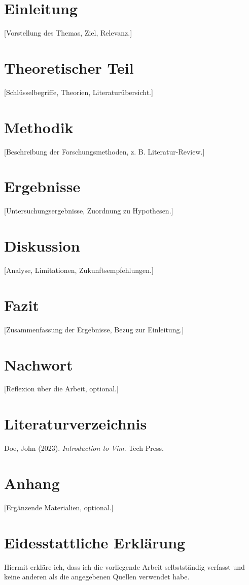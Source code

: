 \documentclass[a4paper,12pt]{article}
\begin{document}
\section{Einleitung}
[Vorstellung des Themas, Ziel, Relevanz.]

\section{Theoretischer Teil}
[Schlüsselbegriffe, Theorien, Literaturübersicht.]

\section{Methodik}
[Beschreibung der Forschungsmethoden, z. B. Literatur-Review.]

\section{Ergebnisse}
[Untersuchungsergebnisse, Zuordnung zu Hypothesen.]

\section{Diskussion}
[Analyse, Limitationen, Zukunftsempfehlungen.]

\section{Fazit}
[Zusammenfassung der Ergebnisse, Bezug zur Einleitung.]

\section*{Nachwort}
[Reflexion über die Arbeit, optional.]

\section*{Literaturverzeichnis}
\begin{thebibliography}{9}
        Doe, John (2023). \emph{Introduction to Vim}. Tech Press.
\end{thebibliography}

\appendix
\section{Anhang}
[Ergänzende Materialien, optional.]

\section*{Eidesstattliche Erklärung}
Hiermit erkläre ich, dass ich die vorliegende Arbeit selbstständig verfasst und keine anderen als die angegebenen Quellen verwendet habe.
\end{document}
